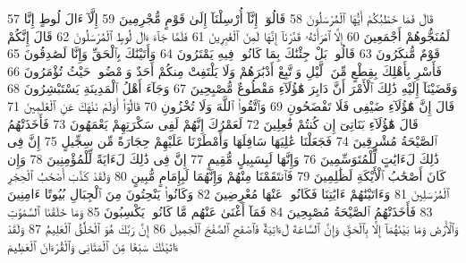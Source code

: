 {\tiny\colorbox{cl_aya}{57}} قَالَ فَمَا خَطْبُكُمْ أَيُّهَا ٱلْمُرْسَلُونَ
{\tiny\colorbox{cl_aya}{58}} قَالُوٓا۟ إِنَّآ أُرْسِلْنَآ إِلَىٰ قَوْمٍ مُّجْرِمِينَ
{\tiny\colorbox{cl_aya}{59}} إِلَّآ ءَالَ لُوطٍ إِنَّا لَمُنَجُّوهُمْ أَجْمَعِينَ
{\tiny\colorbox{cl_aya}{60}} إِلَّا ٱمْرَأَتَهُۥ قَدَّرْنَآ إِنَّهَا لَمِنَ ٱلْغَٰبِرِينَ
{\tiny\colorbox{cl_aya}{61}} فَلَمَّا جَآءَ ءَالَ لُوطٍ ٱلْمُرْسَلُونَ
{\tiny\colorbox{cl_aya}{62}} قَالَ إِنَّكُمْ قَوْمٌ مُّنكَرُونَ
{\tiny\colorbox{cl_aya}{63}} قَالُوا۟ بَلْ جِئْنَٰكَ بِمَا كَانُوا۟ فِيهِ يَمْتَرُونَ
{\tiny\colorbox{cl_aya}{64}} وَأَتَيْنَٰكَ بِٱلْحَقِّ وَإِنَّا لَصَٰدِقُونَ
{\tiny\colorbox{cl_aya}{65}} فَأَسْرِ بِأَهْلِكَ بِقِطْعٍ مِّنَ ٱلَّيْلِ وَٱتَّبِعْ أَدْبَٰرَهُمْ وَلَا يَلْتَفِتْ مِنكُمْ أَحَدٌ وَٱمْضُوا۟ حَيْثُ تُؤْمَرُونَ
{\tiny\colorbox{cl_aya}{66}} وَقَضَيْنَآ إِلَيْهِ ذَٰلِكَ ٱلْأَمْرَ أَنَّ دَابِرَ هَٰٓؤُلَآءِ مَقْطُوعٌ مُّصْبِحِينَ
{\tiny\colorbox{cl_aya}{67}} وَجَآءَ أَهْلُ ٱلْمَدِينَةِ يَسْتَبْشِرُونَ
{\tiny\colorbox{cl_aya}{68}} قَالَ إِنَّ هَٰٓؤُلَآءِ ضَيْفِى فَلَا تَفْضَحُونِ
{\tiny\colorbox{cl_aya}{69}} وَٱتَّقُوا۟ ٱللَّهَ وَلَا تُخْزُونِ
{\tiny\colorbox{cl_aya}{70}} قَالُوٓا۟ أَوَلَمْ نَنْهَكَ عَنِ ٱلْعَٰلَمِينَ
{\tiny\colorbox{cl_aya}{71}} قَالَ هَٰٓؤُلَآءِ بَنَاتِىٓ إِن كُنتُمْ فَٰعِلِينَ
{\tiny\colorbox{cl_aya}{72}} لَعَمْرُكَ إِنَّهُمْ لَفِى سَكْرَتِهِمْ يَعْمَهُونَ
{\tiny\colorbox{cl_aya}{73}} فَأَخَذَتْهُمُ ٱلصَّيْحَةُ مُشْرِقِينَ
{\tiny\colorbox{cl_aya}{74}} فَجَعَلْنَا عَٰلِيَهَا سَافِلَهَا وَأَمْطَرْنَا عَلَيْهِمْ حِجَارَةً مِّن سِجِّيلٍ
{\tiny\colorbox{cl_aya}{75}} إِنَّ فِى ذَٰلِكَ لَءَايَٰتٍ لِّلْمُتَوَسِّمِينَ
{\tiny\colorbox{cl_aya}{76}} وَإِنَّهَا لَبِسَبِيلٍ مُّقِيمٍ
{\tiny\colorbox{cl_aya}{77}} إِنَّ فِى ذَٰلِكَ لَءَايَةً لِّلْمُؤْمِنِينَ
{\tiny\colorbox{cl_aya}{78}} وَإِن كَانَ أَصْحَٰبُ ٱلْأَيْكَةِ لَظَٰلِمِينَ
{\tiny\colorbox{cl_aya}{79}} فَٱنتَقَمْنَا مِنْهُمْ وَإِنَّهُمَا لَبِإِمَامٍ مُّبِينٍ
{\tiny\colorbox{cl_aya}{80}} وَلَقَدْ كَذَّبَ أَصْحَٰبُ ٱلْحِجْرِ ٱلْمُرْسَلِينَ
{\tiny\colorbox{cl_aya}{81}} وَءَاتَيْنَٰهُمْ ءَايَٰتِنَا فَكَانُوا۟ عَنْهَا مُعْرِضِينَ
{\tiny\colorbox{cl_aya}{82}} وَكَانُوا۟ يَنْحِتُونَ مِنَ ٱلْجِبَالِ بُيُوتًا ءَامِنِينَ
{\tiny\colorbox{cl_aya}{83}} فَأَخَذَتْهُمُ ٱلصَّيْحَةُ مُصْبِحِينَ
{\tiny\colorbox{cl_aya}{84}} فَمَآ أَغْنَىٰ عَنْهُم مَّا كَانُوا۟ يَكْسِبُونَ
{\tiny\colorbox{cl_aya}{85}} وَمَا خَلَقْنَا ٱلسَّمَٰوَٰتِ وَٱلْأَرْضَ وَمَا بَيْنَهُمَآ إِلَّا بِٱلْحَقِّ وَإِنَّ ٱلسَّاعَةَ لَءَاتِيَةٌ فَٱصْفَحِ ٱلصَّفْحَ ٱلْجَمِيلَ
{\tiny\colorbox{cl_aya}{86}} إِنَّ رَبَّكَ هُوَ ٱلْخَلَّٰقُ ٱلْعَلِيمُ
{\tiny\colorbox{cl_aya}{87}} وَلَقَدْ ءَاتَيْنَٰكَ سَبْعًا مِّنَ ٱلْمَثَانِى وَٱلْقُرْءَانَ ٱلْعَظِيمَ

